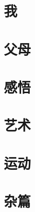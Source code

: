 \documentclass[10pt]{ctexbook}
\begin{document}

\frontmatter

\tableofcontents
\mainmatter


\part{我}




\part{父母}




\part{感悟}





\part{艺术}


\part{运动}





\part{杂篇}




\backmatter
\end{document}
